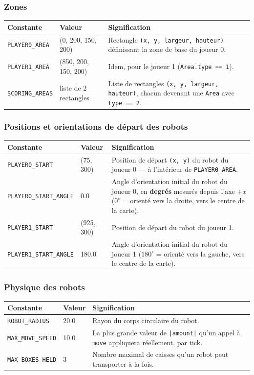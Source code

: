 \documentclass[11pt,a4paper]{article}
\newcommand{\code}[1]{\texttt{#1}}
\newcommand{\func}[1]{\texttt{#1}}
\begin{document}
\subsubsection*{Zones}
\begin{longtable}{p{4.7cm}p{2cm}p{8cm}}
\toprule
\textbf{Constante} & \textbf{Valeur} & \textbf{Signification} \\
\midrule
\endhead
\code{PLAYER0\_AREA} & \scriptsize(0, 200, 150, 200) & Rectangle
    \code{(x, y, largeur, hauteur)} définissant la zone de base du joueur 0. \\
\code{PLAYER1\_AREA} & \scriptsize(850, 200, 150, 200) & Idem, pour le
    joueur 1 (\code{Area.type == 1}). \\
\code{SCORING\_AREAS} & \scriptsize liste de 2 rectangles & Liste de
    rectangles \code{(x, y, largeur, hauteur)}, chacun devenant une
    \code{Area} avec \code{type == 2}. \\
\bottomrule
\end{longtable}

\subsubsection*{Positions et orientations de départ des robots}
\begin{longtable}{p{4.7cm}p{2cm}p{8cm}}
\toprule
\textbf{Constante} & \textbf{Valeur} & \textbf{Signification} \\
\midrule
\endhead
\code{PLAYER0\_START} & (75, 300) & Position de départ \code{(x, y)}
    du robot du joueur 0 --- à l'intérieur de \code{PLAYER0\_AREA}. \\
\code{PLAYER0\_START\_ANGLE} & 0.0 & Angle d'orientation initial du
    robot du joueur 0, en \textbf{degrés} mesurés depuis l'axe $+x$
    ($0^\circ$ = orienté vers la droite, vers le centre de la carte). \\
\code{PLAYER1\_START} & (925, 300) & Position de départ du robot du
    joueur 1. \\
\code{PLAYER1\_START\_ANGLE} & 180.0 & Angle d'orientation initial du
    robot du joueur 1 ($180^\circ$ = orienté vers la gauche, vers le centre
    de la carte). \\
\bottomrule
\end{longtable}

\subsubsection*{Physique des robots}
\begin{longtable}{p{4.7cm}p{2cm}p{8cm}}
\toprule
\textbf{Constante} & \textbf{Valeur} & \textbf{Signification} \\
\midrule
\endhead
\code{ROBOT\_RADIUS} & 20.0 & Rayon du corps circulaire du robot. \\
\code{MAX\_MOVE\_SPEED} & 10.0 & La plus grande valeur de
    \code{|amount|} qu'un appel à \func{move} appliquera réellement, par
    tick. \\
\code{MAX\_BOXES\_HELD} & 3 & Nombre maximal de caisses qu'un robot
    peut transporter à la fois. \\
\bottomrule
\end{longtable}
\end{document}
